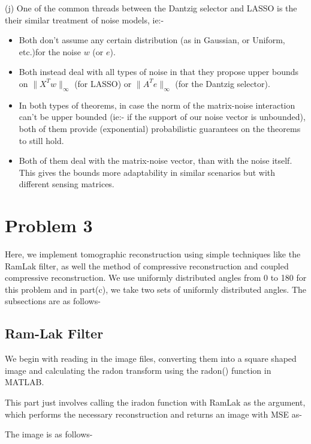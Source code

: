 \documentclass[a4paper,11pt]{article}
\numberwithin{definition}{section}
\numberwithin{mytheorem}{subsection}
\begin{document}
(j) One of the common threads between the Dantzig selector and LASSO is the their similar treatment of noise models, ie:-
\begin{itemize}
    \item Both don't assume any certain distribution (as in Gaussian, or Uniform, etc.)for the noise $w$ (or $e$).
    \item Both instead deal with all types of noise in that they propose upper bounds on $\lVert X^Tw\rVert_{\infty}$ (for LASSO) or $\lVert A^Te\rVert_{\infty}$ (for the Dantzig selector).
    \item In both types of theorems, in case the norm of the matrix-noise interaction can't be upper bounded (ie:- if the support of our noise vector is unbounded), both of them provide (exponential) probabilistic guarantees on the theorems to still hold.
    \item Both of them deal with the matrix-noise vector, than with the noise itself. This gives the bounds more adaptability in similar scenarios but with different sensing matrices.
\end{itemize}




\section{Problem 3}

Here, we implement tomographic reconstruction using simple techniques like the RamLak filter, as well the method of compressive reconstruction and coupled compressive reconstruction. We use uniformly distributed angles from 0 to 180 for this problem and in part(c), we take two sets of uniformly distributed angles. The subsections are as follows-

\subsection{Ram-Lak Filter}

We begin with reading in the image files, converting them into a square shaped image and calculating the radon transform using the radon() function in MATLAB.

This part just involves calling the iradon function with RamLak as the argument, which performs the necessary reconstruction and returns an image with MSE as- 

The image is as follows-
\end{document}
